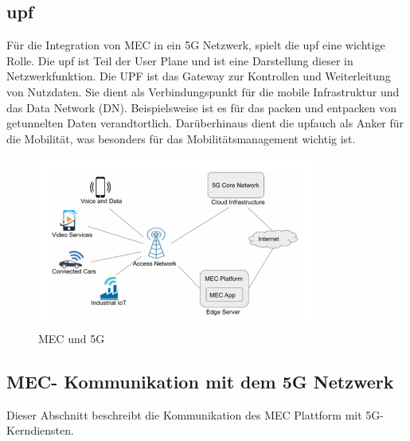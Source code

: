\documentclass[runningheads]{llncs}
\numberwithin{figure}{section}
\begin{document}
\subsection{\acrfull{upf}}
Für die Integration von MEC in ein 5G Netzwerk, spielt die \acrfull{upf} eine wichtige Rolle. Die \acrshort{upf} ist Teil der User Plane
und ist eine Darstellung dieser in Netzwerkfunktion. Die UPF ist das Gateway zur Kontrollen und Weiterleitung von Nutzdaten. 
Sie dient als Verbindungspunkt für die mobile Infrastruktur und das Data Network (DN). Beispielsweise ist es für das packen und entpacken von 
getunnelten Daten verandtortlich. Darüberhinaus dient die \acrshort{upf}auch als Anker für die Mobilität, was besonders für das Mobilitätsmanagement wichtig ist.
\cite{Leitfaden5GCampusnetze2020}
\begin{figure}
  \includegraphics[width=\linewidth]{images/mec-and-5g.png}
  \caption{MEC und 5G}
  \label{fig:mec-and-5g}
\end{figure}

\subsection{MEC- Kommunikation mit dem 5G Netzwerk}
Dieser Abschnitt beschreibt die Kommunikation des MEC
Plattform mit 5G-Kerndiensten.
\end{document}
